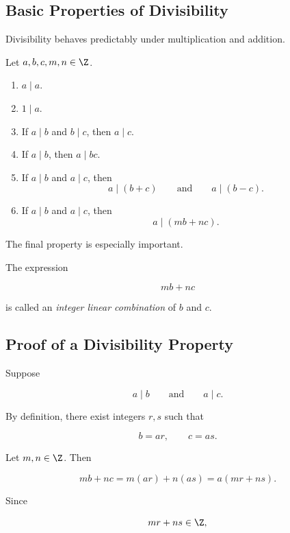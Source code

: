 \subsection{Basic Properties of Divisibility}
\label{subsec:divisibility-properties}

Divisibility behaves predictably under multiplication and addition.

\begin{theorem}
Let \(a,b,c,m,n\in\Z\).

\begin{enumerate}
    \item \(a\mid a\).
    \item \(1\mid a\).
    \item If \(a\mid b\) and \(b\mid c\), then \(a\mid c\).
    \item If \(a\mid b\), then \(a\mid bc\).
    \item If \(a\mid b\) and \(a\mid c\), then
    \[ a\mid(b+c) \qquad\text{and}\qquad a\mid(b-c). \]
    \item If \(a\mid b\) and \(a\mid c\), then
    \[ a\mid(mb+nc). \]
\end{enumerate}
\end{theorem}

The final property is especially important.

The expression

\[ mb+nc \]

is called an \emph{integer linear combination} of \(b\) and \(c\).

\subsection{Proof of a Divisibility Property}
\label{subsec:divisibility-property-proof}

Suppose

\[ a\mid b \qquad\text{and}\qquad a\mid c. \]

By definition, there exist integers \(r,s\) such that

\[ b=ar,\qquad c=as. \]

Let \(m,n\in\Z\). Then

\[ mb+nc=m(ar)+n(as)=a(mr+ns). \]

Since

\[ mr+ns\in\Z, \]

